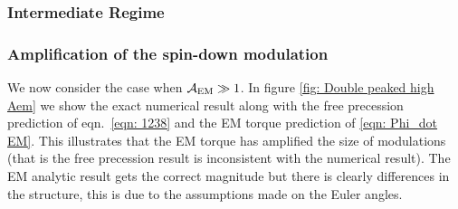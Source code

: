 \documentclass[/home/greg/Thesis/main/main.tex]{subfiles}
\begin{document}

\subsubsection{Intermediate Regime}

\subsubsection{Amplification of the spin-down modulation}

We now consider the case when $\mathcal{A}_{\mathrm{EM}} \gg 1$. In figure \ref{fig: Double peaked
high Aem} we show the exact numerical result along with the free precession
prediction of eqn.~\eqref{eqn: 1238} and the EM torque prediction of
\eqref{eqn: Phi_dot EM}. This illustrates that the EM torque has amplified
the size of modulations (that is the free precession result is inconsistent
with the numerical result). The EM analytic result gets the correct magnitude
but there is clearly differences in the structure, this is due to the assumptions
made on the Euler angles.



\biblio
\end{document}
